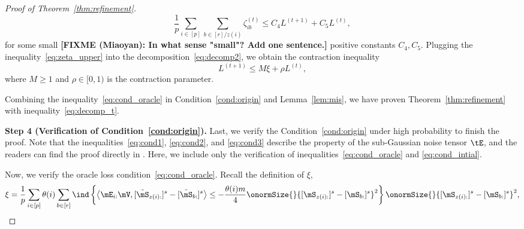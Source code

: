 \documentclass[lettersize,onecolumn,journal]{IEEEtran}
\theoremstyle{definition}
\theoremstyle{definition}
\newcommand{\offf}[1]{\left\{#1\right\}}
\newcommand{\ang}[1]{\left\langle#1\right\rangle}
\def\fixme#1#2{\textbf{\color{red}[FIXME (#1): #2]}}
\begin{document}
\begin{proof}[Proof of Theorem~\ref{thm:refinement}]
    \begin{equation}\label{eq:zeta_upper}
        \frac{1}{p}\sum_{i \in [p] }  \sum_{b \in [r]/z(i)}  \zeta_{ib}^{(t)} \leq  C_4 L^{(t+1)}  + C_5 L^{(t)},
    \end{equation}
    for some small \fixme{Miaoyan}{In what sense "small"? Add one sentence.} positive constants $C_4, C_5$. Plugging the inequality~\eqref{eq:zeta_upper} into the decomposition~\eqref{eq:decomp2}, we obtain the contraction inequality 
    \begin{equation}\label{eq:decomp_t}
          L^{(t+1)} \leq M \xi  + \rho L^{(t)},
    \end{equation}
     where $M \geq 1$ and $\rho \in [0,1)$ is the contraction parameter. 
     
     Combining the inequality~\eqref{eq:cond_oracle} in Condition~\ref{cond:origin} and Lemma~\ref{lem:mis}, we have proven Theorem~\ref{thm:refinement} with inequality~\eqref{eq:decomp_t}.
    
   
    
    {\bf Step 4 (Verification of Condition~\ref{cond:origin}).} Last, we verify the Condition~\ref{cond:origin} under high probability to finish the proof. Note that the inequalities~\eqref{eq:cond1}, \eqref{eq:cond2}, and \eqref{eq:cond3} describe the property of the sub-Gaussian noise tensor $\tE$, and the readers can find the proof directly in \citet[Step 5, Proof of Theorem 2]{han2020exact}. Here, we include only the verification of inequalities~\eqref{eq:cond_oracle} and \eqref{eq:cond_intial}.
    
    Now, we verify the oracle loss condition~\eqref{eq:cond_oracle}. Recall the definition of $\xi$,
    \begin{align}
        \xi = \frac{1}{p} \sum_{i \in [p]} \theta(i) \sum_{b \in [r]} \ind \offf{  \ang{ \mE_{i:} \mV, [  \tilde \mS_{z(i):} ]^s - [  \tilde \mS_{b:} ]^s }  \leq - \frac{\theta(i) m}{4} \onormSize{}{ [ \mS_{z(i):}  ]^s - [ \mS_{b:}  ]^s  }^2 } \onormSize{}{ [ \mS_{z(i):}  ]^s - [ \mS_{ b:}  ]^s  }^2,
    \end{align}


\end{proof}
\end{document}
